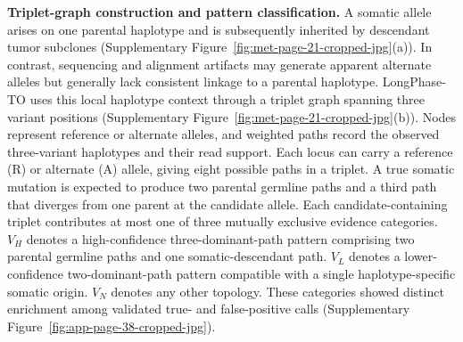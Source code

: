 \documentclass[unnumsec,webpdf,contemporary,large]{oup-authoring-template}
\begin{document}
\noindent\textbf{Triplet-graph construction and pattern classification.} A somatic allele arises on one parental haplotype and is subsequently inherited by descendant tumor subclones (Supplementary Figure~\ref{fig:met-page-21-cropped-jpg}(a)). In contrast, sequencing and alignment artifacts may generate apparent alternate alleles but generally lack consistent linkage to a parental haplotype. LongPhase-TO uses this local haplotype context through a triplet graph spanning three variant positions (Supplementary Figure~\ref{fig:met-page-21-cropped-jpg}(b)). Nodes represent reference or alternate alleles, and weighted paths record the observed three-variant haplotypes and their read support. Each locus can carry a reference (R) or alternate (A) allele, giving eight possible paths in a triplet. A true somatic mutation is expected to produce two parental germline paths and a third path that diverges from one parent at the candidate allele. Each candidate-containing triplet contributes at most one of three mutually exclusive evidence categories. \(V_H\) denotes a high-confidence three-dominant-path pattern comprising two parental germline paths and one somatic-descendant path. \(V_L\) denotes a lower-confidence two-dominant-path pattern compatible with a single haplotype-specific somatic origin. \(V_N\) denotes any other topology. These categories showed distinct enrichment among validated true- and false-positive calls (Supplementary Figure~\ref{fig:app-page-38-cropped-jpg}).
\end{document}
